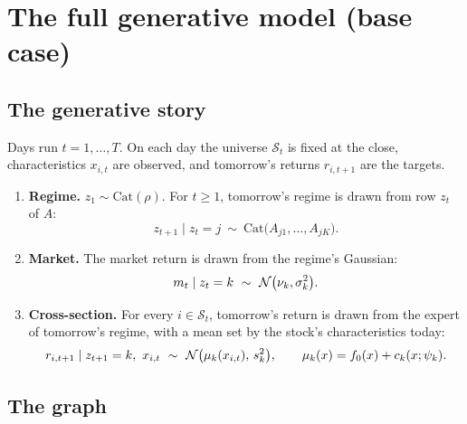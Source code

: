 \section{The full generative model (base case)}

\subsection{The generative story}

Days run $t=1,\dots,T$. On each day the universe $\mathcal S_t$ is fixed at the close, characteristics $x_{i,t}$ are observed, and tomorrow's returns $r_{i,t+1}$ are the targets.

\begin{enumerate}
  \item \textbf{Regime.} $z_1\sim\text{Cat}(\rho)$. For $t\ge1$, tomorrow's regime is drawn from row $z_t$ of $A$:
  \begin{equation}
  z_{t+1}\mid z_t=j\ \sim\ \text{Cat}\big(A_{j1},\dots,A_{jK}\big).
  \end{equation}
  \item \textbf{Market.} The market return is drawn from the regime's Gaussian:
  \begin{equation}
  m_{t}\mid z_{t}=k\ \sim\ \N\big(\nu_k,\sigma_k^2\big).
  \end{equation}
  \item \textbf{Cross-section.} For every $i\in\mathcal S_t$, tomorrow's return is drawn from the expert of tomorrow's regime, with a mean set by the stock's characteristics today:
  \begin{equation}
  r_{i,t+1}\mid z_{t+1}=k,\ x_{i,t}\ \sim\ \N\big(\mu_k(x_{i,t}),\,s_k^2\big),\qquad\mu_k(x)=f_0(x)+c_k(x;\psi_k).
  \end{equation}
\end{enumerate}

\subsection{The graph}

